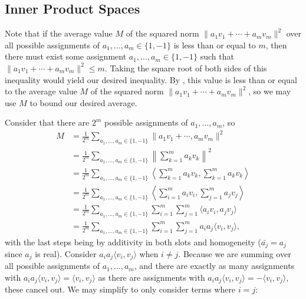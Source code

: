 \subsection{Inner Product Spaces}


\begin{coole}
    Note that if the average value $M$ of the squared norm $\|a_1v_1 + \cdots + a_mv_m\|^2$ over all possible assignments of $a_1, \dots, a_m \in \{1, -1\}$ is less than or equal to $m$, then there must exist some assignment $a_1, \dots, a_m \in \{1, -1\}$ such that $\|a_1v_1 + \cdots + a_mv_m\|^2 \leq m$. Taking the square root of both sides of this inequality would yield our desired inequality. By , this value is less than or equal to the average value $M$ of the squared norm $\|a_1v_1 + \cdots + a_mv_m\|^2$, so we may use $M$ to bound our desired average.

    Consider that there are $2^m$ possible assignments of $a_1, \dots, a_m$, so
    \begin{align*}
    M &= \frac{1}{2^m}\sum_{a_1, \dots, a_m \in \{1, -1\}}\|a_1v_1 + \cdots, a_mv_m\|^2  \\
    &=\frac{1}{2^m}\sum_{a_1, \dots, a_m \in \{1,-1\}}\left\|\sum_{k = 1}^ma_kv_k\right\|^2 \\
    &= \frac{1}{2^m}\sum_{a_1, \dots, a_m \in \{1,-1\}}\left\langle \sum_{k = 1}^ma_kv_k, \sum_{k = 1}^ma_kv_k\right\rangle \\
    &= \frac{1}{2^m}\sum_{a_1, \dots, a_m \in \{1,-1\}}\left\langle \sum_{i = 1}^ma_iv_i, \sum_{j = 1}^ma_jv_j\right\rangle \\
    &= \frac{1}{2^m}\sum_{a_1, \dots, a_m \in \{1,-1\}}\sum_{i = 1}^m\sum_{j = 1}^m\langle a_iv_i, a_jv_j\rangle \\
    &= \frac{1}{2^m}\sum_{a_1, \dots, a_m \in \{1,-1\}}\sum_{i = 1}^m\sum_{j = 1}^ma_ia_j\langle v_i, v_j\rangle,
    \end{align*}
    with the last steps being by additivity in both slots and homogeneity ($\bar{a_j} = a_j$ since $a_j$ is real).
    Consider $a_ia_j\langle v_i, v_j\rangle$ when $i \neq j$.
    Because we are summing over all possible assignments of $a_1, \dots, a_m$, and there are exactly as many assignments with $a_ia_j\langle v_i, v_j \rangle = \langle v_i, v_j \rangle$ as there are assignments with $a_ia_j\langle v_i, v_j \rangle = -\langle v_i, v_j \rangle$, these cancel out. We may simplify to only consider terms where $i = j$:


\end{coole}
